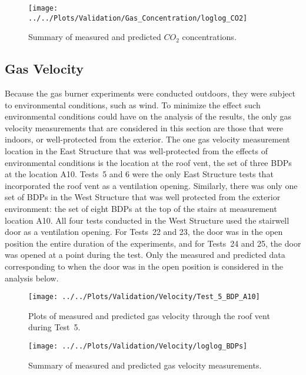 \begin{figure}[!h]
	\centering
	\texttt{[image: ../../Plots/Validation/Gas\_Concentration/loglog\_CO2]}
	\caption{Summary of measured and predicted $CO_2$ concentrations.}
	\label{fig:loglog_CO2}
\end{figure}

\clearpage
\subsection{Gas Velocity}
Because the gas burner experiments were conducted outdoors, they were subject to environmental conditions, such as wind. To minimize the effect such environmental conditions could have on the analysis of the results, the only gas velocity measurements that are considered in this section are those that were indoors, or well-protected from the exterior. The one gas velocity measurement location in the East Structure that was well-protected from the effects of environmental conditions is the location at the roof vent, the set of three BDPs at the location A10. Tests~5 and 6 were the only East Structure tests that incorporated the roof vent as a ventilation opening. Similarly, there was only one set of BDPs in the West Structure that was well protected from the exterior environment: the set of eight BDPs at the top of the stairs at measurement location A10. All four tests conducted in the West Structure used the stairwell door as a ventilation opening. For Tests~22 and 23, the door was in the open position the entire duration of the experiments, and for Tests~24 and 25, the door was opened at a point during the test. Only the measured and predicted data corresponding to when the door was in the open position is considered in the analysis below. 

\begin{figure}[!h]
	\centering
	\texttt{[image: ../../Plots/Validation/Velocity/Test\_5\_BDP\_A10]}
	\caption[Plots of measured and predicted gas velocity through the roof vent during Test~5.]{Plots of measured and predicted gas velocity through the roof vent during Test~5.}
	\label{fig:Test5_BDPs}
\end{figure}

\begin{figure}[!h]
	\centering
	\texttt{[image: ../../Plots/Validation/Velocity/loglog\_BDPs]}
	\caption{Summary of measured and predicted gas velocity measurements.}
	\label{fig:loglog_BDPs}
\end{figure}


